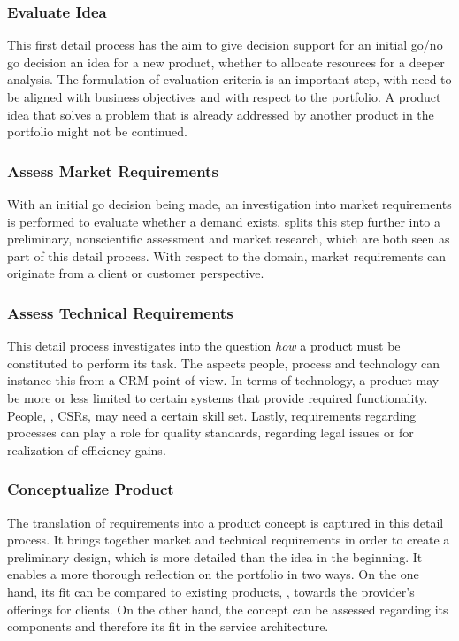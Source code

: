 	\subsubsection{Evaluate Idea}
	This first detail process has the aim to give decision support for an initial go/no go decision \wrt an idea for a new product, \ie whether to allocate resources for a deeper analysis. The formulation of evaluation criteria is an important step, with need to be aligned with business objectives and with respect to the portfolio. A product idea that solves a problem that is already addressed by another product in the portfolio might not be continued.  
	\subsubsection{Assess  Market Requirements}
	With an initial go decision being made, an investigation into market requirements is performed to evaluate whether a demand exists. \citep{Edgett_1996} splits this step further into a preliminary, nonscientific assessment and market research, which are both seen as part of this detail process. With respect to the domain, market requirements can originate from a client or customer perspective. 
	\subsubsection{Assess Technical Requirements}
	This detail process investigates into the question \textit{how} a product must be constituted to perform its task. The aspects people, process and technology can instance this from a \acrshort{CRM} point of view. In terms of technology, a product may be more or less limited to certain systems that provide required functionality. People, \ie, \acrshort{CSR}s, may need a certain skill set. Lastly, requirements regarding processes can play a role for quality standards, regarding legal issues or for realization of efficiency gains.
	
	\subsubsection{Conceptualize Product}
	The translation of requirements into a product concept is captured in this detail process. It brings together market  and technical requirements in order to create a preliminary design, which is more detailed than the idea in the beginning. It enables a more thorough reflection on the portfolio in two ways. On the one hand, its fit can be compared to existing products, \ie, towards the provider's offerings for clients. On the other hand, the concept can be assessed regarding its components and therefore its fit in the service architecture. 
	
